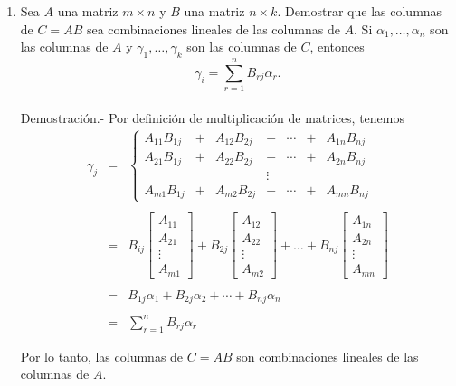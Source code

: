 \begin{enumerate}[1.]
    \item Sea $A$ una matriz $m\times n$ y $B$ una matriz $n\times k$. Demostrar que las columnas de $C=AB$ sea combinaciones lineales de las columnas de $A$. Si $\alpha_1,\ldots , \alpha_n$ son las columnas de $A$ y $\gamma_1,\ldots , \gamma_k$ son las columnas de $C$, entonces
    $$\gamma_i = \sum_{r=1}^n B_{rj}\alpha_{r}.$$\\
	Demostración.-\; Por definición de multiplicación de matrices, tenemos
	$$
	\begin{array}{rcl}
	\gamma_j &=& 
	\left\{\begin{array}{*{7}{c}}
		A_{11}B_{1j} &+& A_{12}B_{2j} &+& \cdots &+& A_{1n}B_{nj}\\
		A_{21}B_{1j} &+& A_{22}B_{2j} &+& \cdots &+& A_{2n}B_{nj}\\
			     &&&\vdots&&&\\
		A_{m1}B_{1j} &+& A_{m2}B_{2j} &+& \cdots &+& A_{mn}B_{nj}
	\end{array}\right.\\\\
	&=&
	B_{ij}
	\left[\begin{array}{c}
		A_{11}\\
		A_{21}\\
		\vdots \\
		A_{m1}
	\end{array}\right]
	+
	B_{2j}
	\left[\begin{array}{c}
		A_{12}\\
		A_{22}\\
		\vdots \\
		A_{m2}
	\end{array}\right]
	+ \ldots + 
	B_{nj}
	\left[\begin{array}{c}
		A_{1n}\\
		A_{2n}\\
		\vdots \\
		A_{mn}
	\end{array}\right]\\\\
	&=&
	B_{1j}\alpha_1 + B_{2j}\alpha_2 + \cdots + B_{nj}\alpha_n\\\\
	&=&
	\sum_{r=1}^n B_{rj}\alpha_{r}
	\end{array}
	$$

	Por lo tanto, las columnas de $C=AB$ son combinaciones lineales de las columnas de $A$.\\\\



\end{enumerate}
